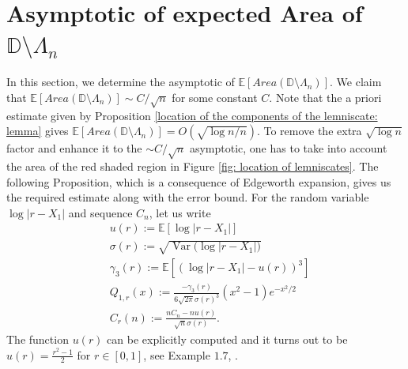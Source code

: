 \documentclass[9pt,a4paper,reqno]{amsart}
\DeclareMathOperator{\Var}{Var}
\theoremstyle{mine}
\theoremstyle{definition}
\theoremstyle{remark}
\newcommand{\mb}{\mathbb}
\begin{document}
\section{Asymptotic of expected Area of \texorpdfstring{$\mb{D}\setminus\Lambda_n$}{D \ Lambda n}}
\label{the section on expected area}

In this section, we determine the asymptotic of $\mb{E}[Area(\mb{D}\setminus \Lambda_n)]$. We claim that $\mb{E}[Area(\mb{D}\setminus \Lambda_n)] \sim C/\sqrt{n}$ for some constant $C$. Note that the a priori estimate given by Proposition \ref{location of the components of the lemniscate: lemma} gives $\mb{E}[Area(\mb{D}\setminus \Lambda_n)] = O(\sqrt{\log n /n})$. 
To remove the extra $\sqrt{\log n }$ factor and enhance it to the $\sim C/\sqrt{n}$ asymptotic, one has to take into account the area of the red shaded region in Figure \ref{fig: location of lemniscates}.
The following Proposition, which is a consequence of Edgeworth expansion, gives us the required estimate along with the error bound. For the random variable $\log|r-X_1|$ and sequence $C_n$, let us write   
\begin{align}\label{some-nota}
    &u(r):= \mb{E}[\log|r-X_1|]  \\  &\sigma(r):= \sqrt{\Var\big(\log|r-X_1|\big)} \nonumber\\ & \gamma_3(r):= \mb{E}[(\log|r-X_1| -u(r))^3] \nonumber\\ & Q_{1,r}(x):=  \frac{-\gamma_3(r)}{6\sqrt{2\pi} \sigma(r)^3} (x^2 -1) e^{-x^2/2} \nonumber \\  
    &C_r(n):=\frac{nC_n- n u(r)}{\sqrt{n}\sigma(r)}.\nonumber
\end{align}
The function $u(r)$ can be explicitly computed and it turns out to be $u(r) = \frac{r^2-1}{2}$ for $r\in [0,1]$, see Example $1.7$, \cite{KLR}.
\end{document}
